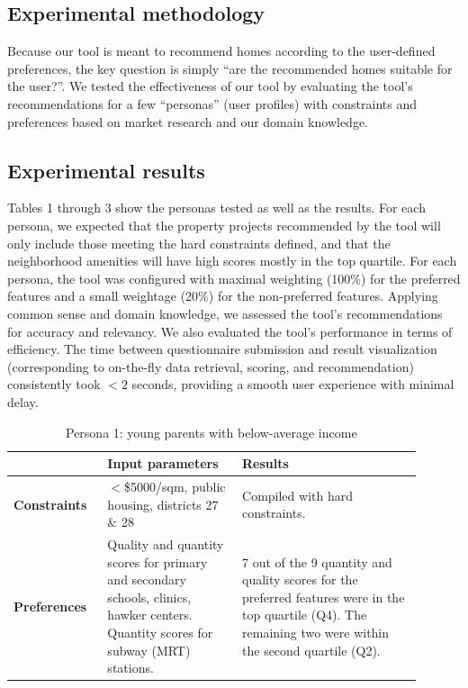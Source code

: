\documentclass[a4paper, 11pt]{article}
\begin{document}
\subsection{Experimental methodology}

Because our tool is meant to recommend homes according to the user-defined preferences, the key question is simply “are the recommended homes suitable for the user?”. We tested the effectiveness of our tool by evaluating the tool's recommendations for a few “personas” (user profiles) with constraints and preferences based on market research and our domain knowledge.

\subsection{Experimental results}

Tables 1 through 3 show the personas tested as well as the results. For each persona, we expected that the property projects recommended by the tool will only include those meeting the hard constraints defined, and that the neighborhood amenities will have high scores mostly in the top quartile. For each persona, the tool was configured with maximal weighting (100\%) for the preferred features and a small weightage (20\%) for the non-preferred features. Applying common sense and domain knowledge, we assessed the tool's recommendations for accuracy and relevancy. We also evaluated the tool's performance in terms of efficiency. The time between questionnaire submission and result visualization (corresponding to on-the-fly data retrieval, scoring, and recommendation) consistently took $<2$ seconds, providing a smooth user experience with minimal delay.

\begin{table}[ht]
    \centering
    \begin{tabular}{p{0.2\linewidth} | p{0.3\linewidth} | p{0.4\linewidth}} \hline
      & \textbf{Input parameters}  & \textbf{Results} \\ \hline
      \textbf{Constraints}& $<$\$5000/sqm, public housing, districts 27 \& 28
  & Compiled with hard constraints. \\ \hline
\textbf{Preferences} & Quality and quantity scores for primary and secondary schools, clinics, hawker centers. Quantity scores for subway (MRT) stations. & 7 out of the 9 quantity and quality scores for the preferred features were in the top quartile (Q4). The remaining two were within the second quartile (Q2). \\\hline
    \end{tabular}
    \caption{Persona 1: young parents with below-average income}
    \label{tab:my_label}
\end{table}
\end{document}
